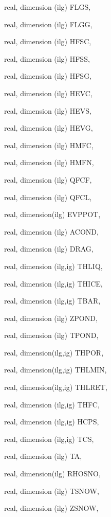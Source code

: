 {\begin{DoxyParamCaption}
\item[{real, dimension  (ilg)}]{F\+L\+G\+S, }
\item[{real, dimension  (ilg)}]{F\+L\+G\+G, }
\item[{real, dimension  (ilg)}]{H\+F\+S\+C, }
\item[{real, dimension  (ilg)}]{H\+F\+S\+S, }
\item[{real, dimension  (ilg)}]{H\+F\+S\+G, }
\item[{real, dimension  (ilg)}]{H\+E\+V\+C, }
\item[{real, dimension  (ilg)}]{H\+E\+V\+S, }
\item[{real, dimension  (ilg)}]{H\+E\+V\+G, }
\item[{real, dimension  (ilg)}]{H\+M\+F\+C, }
\item[{real, dimension  (ilg)}]{H\+M\+F\+N, }
\item[{real, dimension  (ilg)}]{Q\+F\+C\+F, }
\item[{real, dimension  (ilg)}]{Q\+F\+C\+L, }
\item[{real, dimension(ilg)}]{E\+V\+P\+P\+O\+T, }
\item[{real, dimension (ilg)}]{A\+C\+O\+N\+D, }
\item[{real, dimension  (ilg)}]{D\+R\+A\+G, }
\item[{real, dimension (ilg,ig)}]{T\+H\+L\+I\+Q, }
\item[{real, dimension (ilg,ig)}]{T\+H\+I\+C\+E, }
\item[{real, dimension  (ilg,ig)}]{T\+B\+A\+R, }
\item[{real, dimension (ilg)}]{Z\+P\+O\+N\+D, }
\item[{real, dimension (ilg)}]{T\+P\+O\+N\+D, }
\item[{real, dimension(ilg,ig)}]{T\+H\+P\+O\+R, }
\item[{real, dimension(ilg,ig)}]{T\+H\+L\+M\+I\+N, }
\item[{real, dimension(ilg,ig)}]{T\+H\+L\+R\+E\+T, }
\item[{real, dimension  (ilg,ig)}]{T\+H\+F\+C, }
\item[{real, dimension  (ilg,ig)}]{H\+C\+P\+S, }
\item[{real, dimension   (ilg,ig)}]{T\+C\+S, }
\item[{real, dimension    (ilg)}]{T\+A, }
\item[{real, dimension(ilg)}]{R\+H\+O\+S\+N\+O, }
\item[{real, dimension (ilg)}]{T\+S\+N\+O\+W, }
\item[{real, dimension (ilg)}]{Z\+S\+N\+O\+W, }

\end{DoxyParamCaption}}
